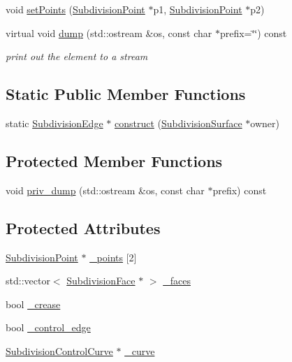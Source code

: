 \begin{DoxyCompactItemize}
void \hyperlink{classShipCAD_1_1SubdivisionEdge_ab86e4ccfa750684432c228ea2cc991ff}{set\-Points} (\hyperlink{classShipCAD_1_1SubdivisionPoint}{Subdivision\-Point} $\ast$p1, \hyperlink{classShipCAD_1_1SubdivisionPoint}{Subdivision\-Point} $\ast$p2)
\item 
virtual void \hyperlink{classShipCAD_1_1SubdivisionEdge_a14cc58877644ebd7b7ebffbdf8ef87f7}{dump} (std\-::ostream \&os, const char $\ast$prefix=\char`\"{}\char`\"{}) const 
\begin{DoxyCompactList}\small\item\em print out the element to a stream \end{DoxyCompactList}\end{DoxyCompactItemize}
\subsection*{Static Public Member Functions}
\begin{DoxyCompactItemize}
\item 
static \hyperlink{classShipCAD_1_1SubdivisionEdge}{Subdivision\-Edge} $\ast$ \hyperlink{classShipCAD_1_1SubdivisionEdge_ac2e94f4689d724a1d5b75c7f2619c37d}{construct} (\hyperlink{classShipCAD_1_1SubdivisionSurface}{Subdivision\-Surface} $\ast$owner)
\end{DoxyCompactItemize}
\subsection*{Protected Member Functions}
\begin{DoxyCompactItemize}
\item 
void \hyperlink{classShipCAD_1_1SubdivisionEdge_a8b33f4ae9edbd8ac4a386d9f5f5c1131}{priv\-\_\-dump} (std\-::ostream \&os, const char $\ast$prefix) const 
\end{DoxyCompactItemize}
\subsection*{Protected Attributes}
\begin{DoxyCompactItemize}
\item 
\hyperlink{classShipCAD_1_1SubdivisionPoint}{Subdivision\-Point} $\ast$ \hyperlink{classShipCAD_1_1SubdivisionEdge_a55519f9d615d6bd701c10c48259525ac}{\-\_\-points} \mbox{[}2\mbox{]}
\item 
std\-::vector$<$ \hyperlink{classShipCAD_1_1SubdivisionFace}{Subdivision\-Face} $\ast$ $>$ \hyperlink{classShipCAD_1_1SubdivisionEdge_aa1da730fcb3ac49c92e803a0b336d855}{\-\_\-faces}
\item 
bool \hyperlink{classShipCAD_1_1SubdivisionEdge_a9ea4714611e4970cf5e4014304a20190}{\-\_\-crease}
\item 
bool \hyperlink{classShipCAD_1_1SubdivisionEdge_ae933ee4901a7964ca50a83edad44e8ec}{\-\_\-control\-\_\-edge}
\item 
\hyperlink{classShipCAD_1_1SubdivisionControlCurve}{Subdivision\-Control\-Curve} $\ast$ \hyperlink{classShipCAD_1_1SubdivisionEdge_a1863a7ef84b2d73f0e1407f3536bbc9f}{\-\_\-curve}
\end{DoxyCompactItemize}

